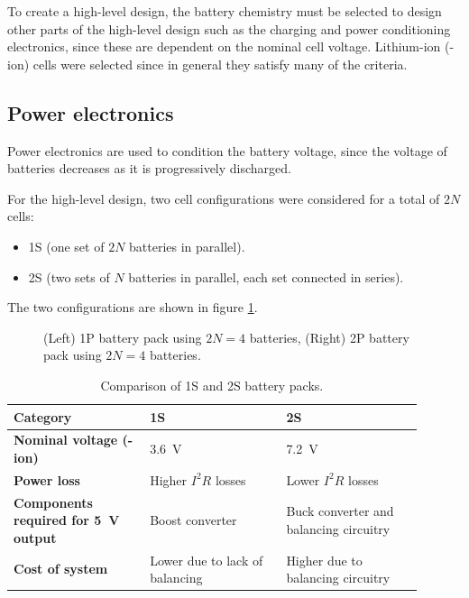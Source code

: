 \documentclass[]{report}
\newcommand{\liion}{\ce{Li}-ion}
\begin{document}
To create a high-level design, the battery chemistry must be selected to design other parts of the high-level design such as the charging and power conditioning electronics, since these are dependent on the nominal cell voltage. Lithium-ion (\liion) cells were selected since in general they satisfy many of the criteria.

\subsection{Power electronics}
\label{sec:hl-power-electronics}
Power electronics are used to condition the battery voltage, since the voltage of batteries decreases as it is progressively discharged.

For the high-level design, two cell configurations were considered for a total of $2N$ cells:
\begin{itemize}
  \item 1S (one set of $2N$ batteries in parallel).
  \item 2S (two sets of $N$ batteries in parallel, each set connected in series).
\end{itemize}

The two configurations are shown in figure \ref{fig:1s2s}.

\begin{figure}[H]
  \centering
  
  \caption{(Left) 1P battery pack using $2N=4$ batteries, (Right) 2P battery pack using $2N=4$ batteries.}
  \label{fig:1s2s}
\end{figure}

\begin{table}[H]
  \centering
  \begin{tabular}{|L{0.3\linewidth}|L{0.3\linewidth}|L{0.3\linewidth}|}
    \hline
    \textbf{Category}                                     & \textbf{1S}                    & \textbf{2S}                            \\\hline
    \textbf{Nominal voltage (\liion)}                     & \SI{3.6}{\volt}                & \SI{7.2}{\volt}                        \\\hline
    \textbf{Power loss}                                   & Higher $I^2R$ losses           & Lower $I^2R$ losses                    \\\hline
    \textbf{Components required for \SI{5}{\volt} output} & Boost converter                & Buck converter and balancing circuitry \\\hline
    \textbf{Cost of system}                               & Lower due to lack of balancing & Higher due to balancing circuitry      \\\hline
  \end{tabular}
  \caption{Comparison of 1S and 2S battery packs.}
  \label{tabl:battery-1s2s-comparison}
\end{table}
\end{document}
